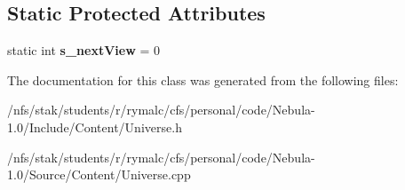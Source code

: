 \subsection*{Static Protected Attributes}
\begin{DoxyCompactItemize}
\item 
\hypertarget{classUniverse_a4f53b4409f86b9e31a10840e64d48212}{
static int {\bfseries s\_\-nextView} = 0}
\label{classUniverse_a4f53b4409f86b9e31a10840e64d48212}

\end{DoxyCompactItemize}


The documentation for this class was generated from the following files:\begin{DoxyCompactItemize}
\item 
/nfs/stak/students/r/rymalc/cfs/personal/code/Nebula-\/1.0/Include/Content/Universe.h\item 
/nfs/stak/students/r/rymalc/cfs/personal/code/Nebula-\/1.0/Source/Content/Universe.cpp\end{DoxyCompactItemize}
